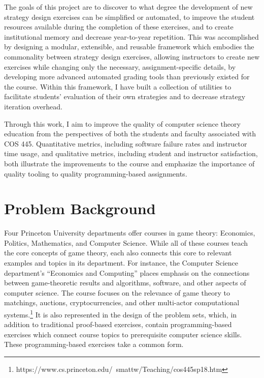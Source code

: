 \documentclass[pageno]{jpaper}
\begin{document}
The goals of this project are to discover to what degree the development of new strategy design exercises can be simplified or automated, to improve the student resources available during the completion of these exercises, and to create institutional memory and decrease year-to-year repetition.
This was accomplished by designing a modular, extensible, and reusable framework which embodies the commonality between strategy design exercises, allowing instructors to create new exercises while changing only the necessary, assignment-specific details, by developing more advanced automated grading tools than previously existed for the course.
Within this framework, I have built a collection of utilities to facilitate students' evaluation of their own strategies and to decrease strategy iteration overhead.

Through this work, I aim to improve the quality of computer science theory education from the perspectives of both the students and faculty associated with COS 445.
Quantitative metrics, including software failure rates and instructor time usage, and qualitative metrics, including student and instructor satisfaction, both illustrate the improvements to the course and emphasize the importance of quality tooling to quality programming-based assignments.

\section*{Problem Background}
Four Princeton University departments offer courses in game theory: Economics, Politics, Mathematics, and Computer Science.
While all of these courses teach the core concepts of game theory, each also connects this core to relevant examples and topics in its department.
For instance, the Computer Science department's ``Economics and Computing'' places emphasis on the connections between game-theoretic results and algorithms, software, and other aspects of computer science.
The course focuses on the relevance of game theory to matchings, auctions, cryptocurrencies, and other multi-actor computational systems.\footnote{https://www.cs.princeton.edu/~smattw/Teaching/cos445sp18.htm}
It is also represented in the design of the problem sets, which, in addition to traditional proof-based exercises, contain programming-based exercises which connect course topics to prerequisite computer science skills.
These programming-based exercises take a common form.
\end{document}
